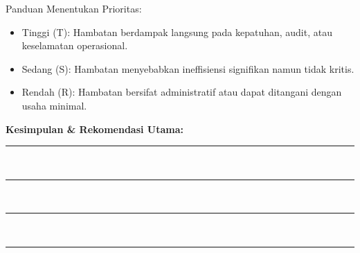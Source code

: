 \documentclass[12pt,a4paper]{report}
\begin{document}
\noindent
{}

\vspace{0.3cm}

\vspace{0.5cm}

\begin{wstipbox}
Panduan Menentukan Prioritas:
\begin{itemize}
    \item Tinggi (T): Hambatan berdampak langsung pada kepatuhan, audit, atau keselamatan operasional.
    \item Sedang (S): Hambatan menyebabkan ineffisiensi signifikan namun tidak kritis.
    \item Rendah (R): Hambatan bersifat administratif atau dapat ditangani dengan usaha minimal.
\end{itemize}
\end{wstipbox}

\vspace{0.3cm}

\noindent\textbf{Kesimpulan \& Rekomendasi Utama:}\\[0.2cm]
\noindent\rule{\textwidth}{0.3pt}\writespace[0.8cm]\\
\noindent\rule{\textwidth}{0.3pt}\writespace[0.8cm]\\
\noindent\rule{\textwidth}{0.3pt}\writespace[0.8cm]\\
\noindent\rule{\textwidth}{0.3pt}
\end{document}
